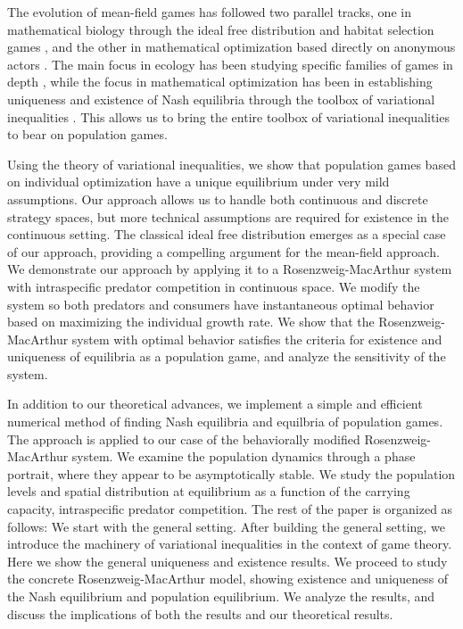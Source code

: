 The evolution of mean-field games has followed two parallel tracks, one in mathematical biology through the ideal free distribution and habitat selection games \citep{fretwell1969territorial, cressman2004ideal, kvrivan2008ideal, cressman2010ideal, broom2013game, parker1978searching}, and the other in mathematical optimization based directly on anonymous actors \citep{lasry2007mean, aumann1964markets, blanchet2016optimal}. The main focus in ecology has been studying specific families of games in depth \cite{broom2013game}, while the focus in mathematical optimization has been in establishing uniqueness and existence of Nash equilibria through the toolbox of variational inequalities \citep{karamardian1969nonlinear, gabay1980uniqueness, nabetani2011parametrized}. This allows us to bring the entire toolbox of variational inequalities to bear on population games.


Using the theory of variational inequalities, we show that population games based on individual optimization have a unique equilibrium under very mild assumptions. Our approach allows us to handle both continuous and discrete strategy spaces, but more technical assumptions are required for existence in the continuous setting. The classical ideal free distribution emerges as a special case of our approach, providing a compelling argument for the mean-field approach. We demonstrate our approach by applying it to a Rosenzweig-MacArthur system with intraspecific predator competition in continuous space. We modify the system so both predators and consumers have instantaneous optimal behavior based on maximizing the individual growth rate. We show that the Rosenzweig-MacArthur system with optimal behavior satisfies the criteria for existence and uniqueness of equilibria as a population game, and analyze the sensitivity of the system.


In addition to our theoretical advances, we implement a simple and efficient numerical method of finding Nash equilibria and equilbria of population games. The approach is applied to our case of the behaviorally modified Rosenzweig-MacArthur system. We examine the population dynamics through a phase portrait, where they appear to be asymptotically stable. We study the population levels and spatial distribution at equilibrium as a function of the carrying capacity, intraspecific predator competition. The rest of the paper is organized as follows: We start with the general setting. After building the general setting, we introduce the machinery of variational inequalities in the context of game theory. Here we show the general uniqueness and existence results. We proceed to study the concrete Rosenzweig-MacArthur model, showing existence and uniqueness of the Nash equilibrium and population equilibrium. We analyze the results, and discuss the implications of both the results and our theoretical results.

